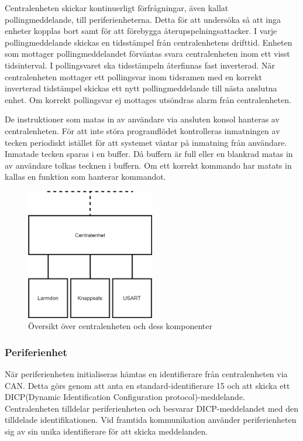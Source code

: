 \documentclass[a4paper]{article}
\begin{document}
Centralenheten skickar kontinuerligt förfrågningar, även kallat pollingmeddelande, till periferienheterna.
Detta för att undersöka så att inga enheter kopplas bort samt för att förebygga återupspelningsattacker.
I varje pollingmeddelande skickas en tidsstämpel från centralenhetens drifttid.
Enheten som mottager pollingmeddelandet förväntas svara centralenheten inom ett visst tidsinterval.
I pollingsvaret ska tidsstämpeln återfinnas fast inverterad.
När centralenheten mottager ett pollingsvar inom tidsramen med en korrekt inverterad tidstämpel skickas ett nytt pollingmeddelande till nästa anslutna enhet.
Om korrekt pollingsvar ej mottages utsöndras alarm från centralenheten.

De instruktioner som matas in av användare via ansluten konsol hanteras av centralenheten.
För att inte störa programflödet kontrolleras inmatningen av tecken periodiskt istället för att systemet väntar på inmatning från användare.
Inmatade tecken sparas i en buffer.
Då buffern är full eller en blankrad matas in av användare tolkas tecknen i buffern.
Om ett korrekt kommando har matats in kallas en funktion som hanterar kommandot.

\begin{figure}[H]
    \centering
    \includegraphics[width=0.5\textwidth]{central-oversikt-pp.png}
    \caption{Översikt över centralenheten och dess komponenter}
\end{figure}


\subsubsection{Periferienhet}
När periferienheten initialiseras hämtas en identifierare från centralenheten via CAN.
Detta görs genom att anta en standard-identifierare 15 och att skicka ett DICP(Dynamic Identification Configuration protocol)-meddelande.
Centralenheten tilldelar periferienheten och besvarar DICP-meddelandet med den tilldelade identifikationen.
Vid framtida kommunikation använder periferienheten sig av sin unika identifierare för att skicka meddelanden.
\end{document}
